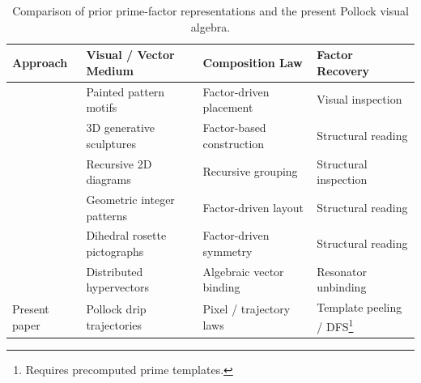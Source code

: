 \documentclass[]{interact}
\theoremstyle{plain}
\theoremstyle{definition}
\theoremstyle{remark}
\begin{document}
\begin{table}[ht]
  \centering
  \caption{Comparison of prior prime-factor representations and the present Pollock visual algebra.}
  \label{tab:lit}
  \footnotesize
  \begin{tabular}{@{}llll@{}}
    \toprule
    Approach & Visual / Vector Medium & Composition Law & Factor Recovery \\
    \midrule
    \citet{ashwell2020prime} & Painted pattern motifs & Factor-driven placement & Visual inspection \\
    \citet{huff2006visually} & 3D generative sculptures & Factor-based construction & Structural reading \\
    \citet{yorgey2012factorization} & Recursive 2D diagrams & Recursive grouping & Structural inspection \\
    \citet{reimann2024visual} & Geometric integer patterns & Factor-driven layout & Structural reading \\
    \citet{basegmez2026symmetries} & Dihedral rosette pictographs & Factor-driven symmetry & Structural reading \\
    \citet{kleyko2022integer} & Distributed hypervectors & Algebraic vector binding & Resonator unbinding \\
    Present paper & Pollock drip trajectories & Pixel / trajectory laws & Template peeling / DFS\footnote{Requires precomputed prime templates.} \\
    \bottomrule
  \end{tabular}
\end{table}
\end{document}
